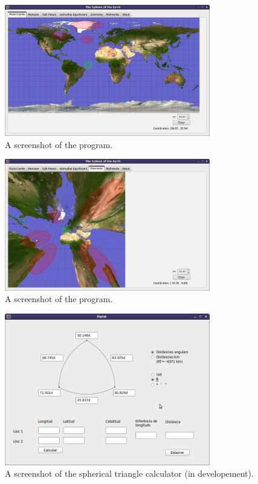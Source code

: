 \documentclass[a4paper,12pt]{article}
\begin{document}
\begin{figure}[h]
\begin{center}
\includegraphics[width=0.8\textwidth]{../common/soe1.png}
\caption{A screenshot of the program.}
\end{center}
\end{figure}
 
 \begin{figure}[h]
\begin{center}
\includegraphics[width=0.8\textwidth]{../common/soe2.png}
\caption{A screenshot of the program.}
\end{center}
\end{figure}

 
 \begin{figure}[h]
\begin{center}
\includegraphics[width=0.8\textwidth]{../common/triang.png}
\caption{A screenshot of the spherical triangle calculator (in developement).}
\end{center}
\end{figure}
 
 
\end{document}

